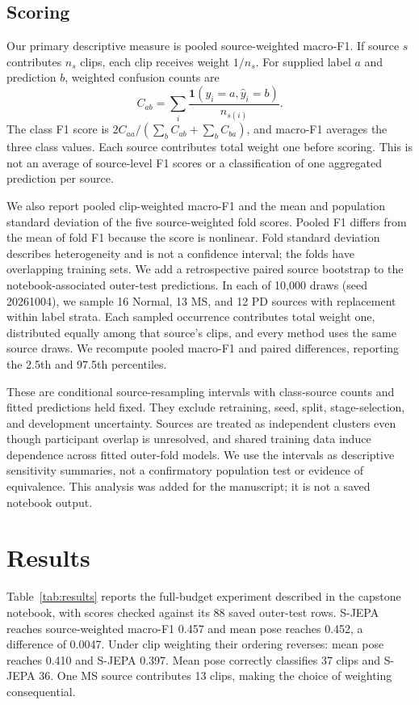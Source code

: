 \documentclass[10pt,twocolumn,letterpaper]{article}
\begin{document}
\subsection{Scoring}
Our primary descriptive measure is pooled source-weighted macro-F1. If source $s$ contributes $n_s$ clips, each clip receives weight $1/n_s$. For supplied label $a$ and prediction $b$, weighted confusion counts are
\begin{equation}
C_{ab}=\sum_i \frac{\mathbf{1}(y_i=a,\widehat{y}_i=b)}{n_{s(i)}}.
\end{equation}
The class F1 score is $2C_{aa}/(\sum_b C_{ab}+\sum_b C_{ba})$, and macro-F1 averages the three class values. Each source contributes total weight one before scoring. This is not an average of source-level F1 scores or a classification of one aggregated prediction per source.

We also report pooled clip-weighted macro-F1 and the mean and population standard deviation of the five source-weighted fold scores. Pooled F1 differs from the mean of fold F1 because the score is nonlinear. Fold standard deviation describes heterogeneity and is not a confidence interval; the folds have overlapping training sets. We add a retrospective paired source bootstrap to the notebook-associated outer-test predictions. In each of 10,000 draws (seed 20261004), we sample 16 Normal, 13 MS, and 12 PD sources with replacement within label strata. Each sampled occurrence contributes total weight one, distributed equally among that source's clips, and every method uses the same source draws. We recompute pooled macro-F1 and paired differences, reporting the 2.5th and 97.5th percentiles.

These are conditional source-resampling intervals with class-source counts and fitted predictions held fixed. They exclude retraining, seed, split, stage-selection, and development uncertainty. Sources are treated as independent clusters even though participant overlap is unresolved, and shared training data induce dependence across fitted outer-fold models. We use the intervals as descriptive sensitivity summaries, not a confirmatory population test or evidence of equivalence. This analysis was added for the manuscript; it is not a saved notebook output.

\section{Results}
Table~\ref{tab:results} reports the full-budget experiment described in the capstone notebook, with scores checked against its 88 saved outer-test rows. S-JEPA reaches source-weighted macro-F1 0.457 and mean pose reaches 0.452, a difference of 0.0047. Under clip weighting their ordering reverses: mean pose reaches 0.410 and S-JEPA 0.397. Mean pose correctly classifies 37 clips and S-JEPA 36. One MS source contributes 13 clips, making the choice of weighting consequential.
\end{document}
